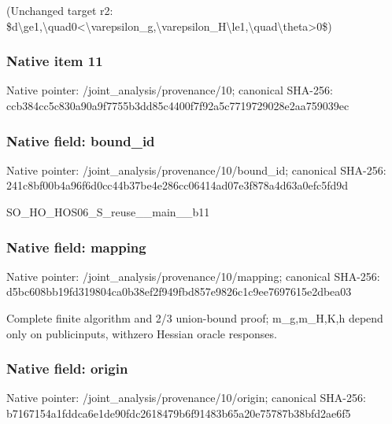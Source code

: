 \documentclass[10pt,a4paper]{article}
\begin{document}
\begingroup\raggedright\sloppy (Unchanged target r2:\allowbreak{} \$d\textbackslash{}ge1,\allowbreak{}\textbackslash{}quad0<\textbackslash{}varepsilon\_\allowbreak{}g,\allowbreak{}\textbackslash{}varepsilon\_\allowbreak{}H\textbackslash{}le1,\allowbreak{}\textbackslash{}quad\textbackslash{}theta>0\$)\par\endgroup

\subsubsection{Native item 11}
Native pointer: /joint\_\allowbreak{}analysis/provenance/10; canonical SHA-256: ccb384cc5c830a90a9f7755b3dd85c4400f7f92a5c7719729028e2aa759039ec

\subsubsection{Native field: bound\_\allowbreak{}id}
Native pointer: /joint\_\allowbreak{}analysis/provenance/10/bound\_\allowbreak{}id; canonical SHA-256: 241c8bf00b4a96f6d0cc44b37be4e286cc06414ad07e3f878a4d63a0efc5fd9d

\begingroup\raggedright\sloppy SO\_\allowbreak{}HO\_\allowbreak{}HOS06\_\allowbreak{}S\_\allowbreak{}reuse\_\allowbreak{}\_\allowbreak{}main\_\allowbreak{}\_\allowbreak{}b11\par\endgroup

\subsubsection{Native field: mapping}
Native pointer: /joint\_\allowbreak{}analysis/provenance/10/mapping; canonical SHA-256: d5bc608bb19fd319804ca0b38ef2f949fbd857e9826c1c9ee7697615e2dbea03

\begingroup\raggedright\sloppy Complete finite algorithm and 2/\allowbreak{}3 union-bound proof;\allowbreak{} m\_\allowbreak{}g,\allowbreak{}m\_\allowbreak{}H,\allowbreak{}K,\allowbreak{}h depend only on publicinputs,\allowbreak{} withzero Hessian oracle responses.\par\endgroup

\subsubsection{Native field: origin}
Native pointer: /joint\_\allowbreak{}analysis/provenance/10/origin; canonical SHA-256: b7167154a1fddca6e1de90fdc2618479b6f91483b65a20e75787b38bfd2ae6f5
\end{document}
